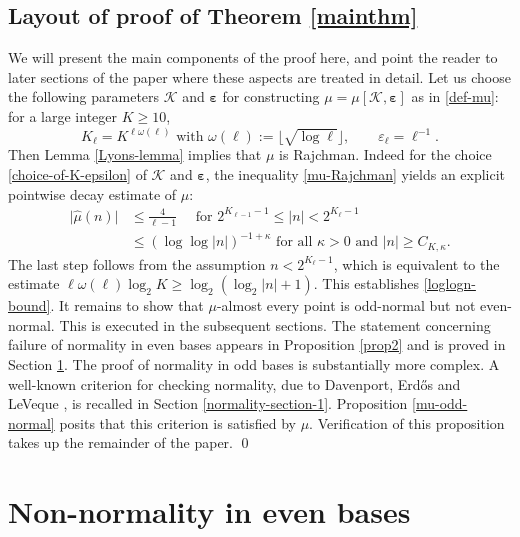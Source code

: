 \documentclass[12pt, twoside]{article}
\theoremstyle{definition}
\numberwithin{equation}{section}
\begin{document}
\subsection{Layout of proof of Theorem \ref{mainthm}} \label{proof-sketch-section} 
We will present the main components of the proof here, and point the reader to later sections of the paper where these aspects are treated in detail.  Let us choose the following parameters $\mathcal K$ and $\pmb{\varepsilon}$ for constructing $\mu = \mu[\mathcal K, \pmb{\varepsilon}]$ as in \eqref{def-mu}: for a large integer $K \geq 10$, 
\begin{equation} \label{choice-of-K-epsilon} 
K_{\ell} = K^{\ell \omega(\ell)} \text{ with } \omega(\ell) := \lfloor \sqrt{\log \ell} \rfloor,  \qquad \varepsilon_{\ell} = \ell^{-1}.   
\end{equation}  
Then Lemma \ref{Lyons-lemma} implies that $\mu$ is Rajchman. Indeed for the choice \eqref{choice-of-K-epsilon} of $\mathcal K$ and $\pmb{\varepsilon}$, the inequality \eqref{mu-Rajchman} yields an explicit pointwise decay estimate of $\mu$:  
\begin{align*} 
\bigl| \widehat{\mu}(n) \bigr| &\leq \frac{4}{\ell-1} \quad \text{ for } 2^{K_{\ell-1} -1} \leq |n| < 2^{K_{\ell}-1} \\ 
&\leq (\log \log |n|)^{-1 + \kappa} \text{ for all } \kappa > 0 \text{ and } |n| \geq C_{K, \kappa}. 
\end{align*}
The last step follows from the assumption $n < 2^{K_{\ell}-1}$, which is equivalent to the estimate $\ell \omega(\ell) \log_2 K \geq \log_2(\log_2 |n| +1)$. This establishes \eqref{loglogn-bound}. 
\vskip0.1in 
\noindent It remains to show that $\mu$-almost every point is odd-normal but not even-normal. This is executed in the subsequent sections. The statement concerning failure of normality in even bases appears in Proposition \ref{prop2} and is proved in Section \ref{non-normality-section}. The proof of normality in odd bases is substantially more complex. A well-known criterion for checking normality, due to Davenport, Erd\H{o}s and LeVeque \cite{del63}, is recalled in Section \ref{normality-section-1}. Proposition \ref{mu-odd-normal} posits that this criterion is satisfied by $\mu$. Verification of this proposition takes up the remainder of the paper. 
\qed

\section{Non-normality in even bases}    \label{non-normality-section}
\end{document}
